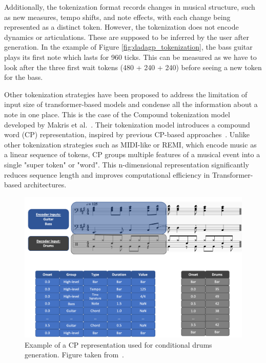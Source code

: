 Additionally, the tokenization format records changes in musical structure, such as new measures, tempo shifts, and note effects, with each change being represented as a distinct token.
However, the tokenization does not encode dynamics or articulations. These are supposed to be inferred by the user after generation.
In the example of Figure \ref{fig:dadagp_tokenization}, the bass guitar plays its first note which lasts for 960 ticks.
This can be measured as we have to look after the three first wait tokens (480 + 240 + 240) before seeing a new token for the bass.


Other tokenization strategies have been proposed to address the limitation of input size of transformer-based models and condense all the information about a note in one place.
This is the case of the Compound tokenization model developed by Makris et al.~\cite{makris_conditional_2022}.
Their tokenization model introduces a compound word (CP) representation, inspired by previous CP-based approaches~\cite{hsiao_compound_2021}.
Unlike other tokenization strategies such as MIDI-like or REMI, which encode music as a linear sequence of tokens, CP groups multiple features of a musical event into a single "super token" or "word".
This n-dimensional representation significantly reduces sequence length and improves computational efficiency in Transformer-based architectures.

\begin{figure}[!h]
    \centering
    \includegraphics[width=.9\linewidth]{../images-figures/tokenization_makris.png}
    \caption{Example of a CP representation used for conditional drums generation. Figure taken from~\cite{makris_conditional_2022}.}
    \label{fig:compound_gen_tokenization}
\end{figure}

